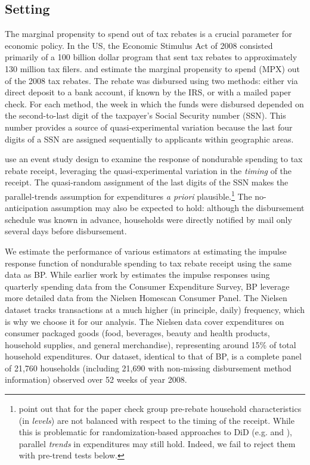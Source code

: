 \documentclass[english,11pt]{article}
\theoremstyle{plain}
\theoremstyle{plain}
\theoremstyle{plain}
\theoremstyle{plain}
\begin{document}
\subsection{Setting}

The marginal propensity to spend out of tax rebates is a crucial parameter
for economic policy. In the US, the Economic Stimulus Act of 2008
consisted primarily of a 100 billion dollar program that sent tax
rebates to approximately 130 million tax filers. \textcite{Parker2013}
and \textcite{Broda2014} estimate the marginal propensity to spend
(MPX) out of the 2008 tax rebates. The rebate was disbursed using
two methods: either via direct deposit to a bank account, if known
by the IRS, or with a mailed paper check. For each method, the week
in which the funds were disbursed depended on the second-to-last digit
of the taxpayer's Social Security number (SSN). This number provides
a source of quasi-experimental variation because the last four digits
of a SSN are assigned sequentially to applicants within geographic
areas.

\textcite[henceforth BP]{Broda2014} use an event study design to
examine the response of nondurable spending to tax rebate receipt,
leveraging the quasi-experimental variation in the \emph{timing} of
the receipt. The quasi-random assignment of the last digits of the
SSN makes the parallel-trends assumption for expenditures \emph{a
priori} plausible.\footnote{\textcite{Thakral2020} point out that for the paper check group pre-rebate
household characteristics (in \emph{levels}) are not balanced with
respect to the timing of the receipt. While this is problematic for
randomization-based approaches to DiD (e.g. \textcite{Arkhangelsky2019}
and \textcite{Roth2021}), parallel \emph{trends }in expenditures
may still hold. Indeed, we fail to reject them with pre-trend tests
below.} The no-anticipation assumption may also be expected to hold: although
the disbursement schedule was known in advance, households were directly
notified by mail only several days before disbursement.

We estimate the performance of various estimators at estimating the
impulse response function of nondurable spending to tax rebate receipt
using the same data as BP. While earlier work by \textcite{Parker2013}
estimates the impulse responses using quarterly spending data from
the Consumer Expenditure Survey, BP leverage more detailed data from
the Nielsen Homescan Consumer Panel. The Nielsen dataset tracks transactions
at a much higher (in principle, daily) frequency, which is why we
choose it for our analysis. The Nielsen data cover expenditures on
consumer packaged goods (food, beverages, beauty and health products,
household supplies, and general merchandise), representing around
15\% of total household expenditures. Our dataset, identical to that
of BP, is a complete panel of 21,760 households (including 21,690
with non-missing disbursement method information) observed over 52
weeks of year 2008.
\end{document}
